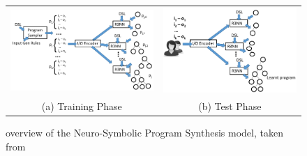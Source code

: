 \documentclass{article} %
\begin{document}
\vspace{-10pt}
\begin{figure}[h]
    \begin{tabular}{c|c}
        \begin{minipage}{0.5\linewidth}
            \includegraphics[scale=0.3]{figures/nsps_training.pdf}
        \end{minipage}
        &
        \begin{minipage}{0.5\linewidth}
            \includegraphics[scale=0.3]{figures/nsps_test.pdf}
        \end{minipage}
        \\
        (a) Training Phase & (b) Test Phase
    \end{tabular}
    \caption{overview of the Neuro-Symbolic Program Synthesis model, taken from \citep{nsps}}
    \label{nsps}
    \vspace{-10pt}
\end{figure}
\end{document}
